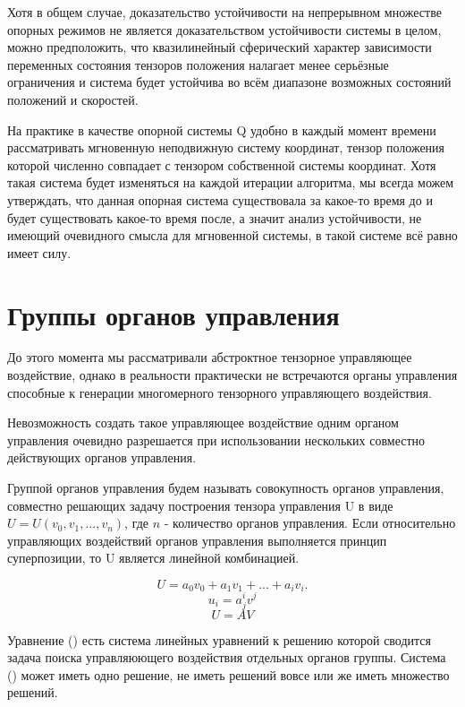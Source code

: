 \documentclass[a4paper]{article}
\begin{document}
Хотя в общем случае, доказательство устойчивости на непрерывном множестве опорных режимов не является доказательством устойчивости системы в целом, можно предположить, что квазилинейный сферический характер зависимости переменных состояния тензоров положения налагает менее серьёзные ограничения и система будет устойчива во всём диапазоне возможных состояний положений и скоростей.

На практике в качестве опорной системы Q удобно в каждый момент времени рассматривать мгновенную неподвижную систему координат, тензор положения которой численно совпадает с тензором собственной системы координат. Хотя такая система будет изменяться на каждой итерации алгоритма, мы всегда можем утверждать, что данная опорная система существовала за какое-то время до и будет существовать какое-то время после, а значит анализ устойчивости, не имеющий очевидного смысла для мгновенной системы, в такой системе всё равно имеет силу. 

\section{Группы органов управления}
До этого момента мы рассматривали абстроктное тензорное управляющее воздействие, однако в реальности практически не встречаются органы управления способные к генерации многомерного тензорного управляющего воздействия.

Невозможность создать такое управляющее воздействие одним органом управления очевидно разрешается при использовании нескольких совместно действующих органов управления.

Группой органов управления будем называть совокупность органов управления, совместно решающих задачу построения тензора управления U в виде $U = U(v_0, v_1, ..., v_n)$, где $n$ - количество органов управления. Если относительно управляющих воздействий органов управления выполняется принцип суперпозиции, то U является линейной комбинацией. 

\begin{equation}U = a_0v_0 + a_1v_1 + ... + a_iv_i.\end{equation}
\begin{equation}u_i=a^i_jv^j\end{equation}
\begin{equation}U = AV\end{equation}

Уравнение () есть система линейных уравнений к решению которой сводится задача поиска управляюющего воздействия отдельных органов группы. Система () может иметь одно решение, не иметь решений вовсе или же иметь множество решений.
\end{document}
